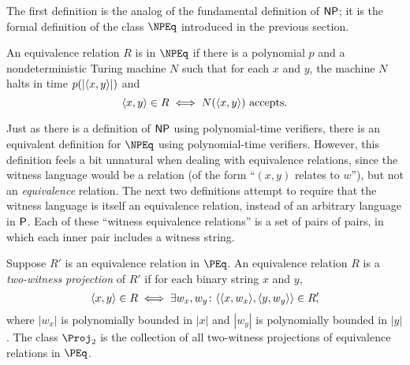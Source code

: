 The first definition is the analog of the fundamental definition of $\NP$; it is the formal definition of the class $\NPEq$ introduced in the previous section.

\begin{definition}\label{def:npeq1}
  An equivalence relation $R$ is in $\NPEq$ if there is a polynomial $p$ and a nondeterministic Turing machine $N$ such that for each $x$ and $y$, the machine $N$ halts in time $p(\left|\pair{x}{y}\right|)$ and
  \begin{displaymath}
    \pair{x}{y} \in R \iff N(\pair{x}{y}) \text{ accepts}.
  \end{displaymath}
\end{definition}

Just as there is a definition of $\NP$ using polynomial-time verifiers, there is an equivalent definition for $\NPEq$ using polynomial-time verifiers.
However, this definition feels a bit unnatural when dealing with equivalence relations, since the witness language would be a relation (of the form ``$(x, y)$ relates to $w$''), but not an \emph{equivalence} relation.
The next two definitions attempt to require that the witness language is itself an equivalence relation, instead of an arbitrary language in $\P$.
Each of these ``witness equivalence relations'' is a set of pairs of pairs, in which each inner pair includes a witness string.

\begin{definition}\label{def:npeq3}
  Suppose $R'$ is an equivalence relation in $\PEq$.
  An equivalence relation $R$ is a \emph{two-witness projection} of $R'$ if for each binary string $x$ and $y$,
  \begin{displaymath}
    \pair{x}{y} \in R \iff \exists w_x, w_y \colon \pair{\pair{x}{w_x}}{\pair{y}{w_y}} \in R'\kern-0.3em,
  \end{displaymath}
  where $|w_x|$ is polynomially bounded in $|x|$ and $|w_y|$ is polynomially bounded in $|y|$.
  The class $\Proj_2$ is the collection of all two-witness projections of equivalence relations in $\PEq$.
\end{definition}

